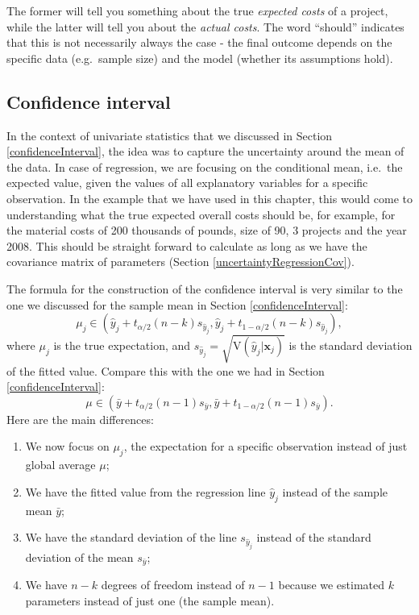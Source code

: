 \documentclass[
]{book}
\providecommand{\tightlist}{%
  \setlength{\itemsep}{0pt}\setlength{\parskip}{0pt}}
\theoremstyle{definition}
\theoremstyle{definition}
\theoremstyle{definition}
\theoremstyle{definition}
\theoremstyle{remark}
\begin{document}
The former will tell you something about the true \emph{expected costs} of a project, while the latter will tell you about the \emph{actual costs}. The word ``should'' indicates that this is not necessarily always the case - the final outcome depends on the specific data (e.g.~sample size) and the model (whether its assumptions hold).

\subsection{Confidence interval}\label{uncertaintyRegressionLineConfidence}

In the context of univariate statistics that we discussed in Section \ref{confidenceInterval}, the idea was to capture the uncertainty around the mean of the data. In case of regression, we are focusing on the conditional mean, i.e.~the expected value, given the values of all explanatory variables for a specific observation. In the example that we have used in this chapter, this would come to understanding what the true expected overall costs should be, for example, for the material costs of 200 thousands of pounds, size of 90, 3 projects and the year 2008. This should be straight forward to calculate as long as we have the covariance matrix of parameters (Section \ref{uncertaintyRegressionCov}).

The formula for the construction of the confidence interval is very similar to the one we discussed for the sample mean in Section \ref{confidenceInterval}:
\begin{equation}
\mu_j \in (\hat{y}_j + t_{\alpha/2}(n-k) s_{\hat{y}_j}, \hat{y}_j + t_{1-\alpha/2}(n-k) s_{\hat{y}_j}),
\label{eq:confidenceIntervalRegression}
\end{equation}
where \(\mu_j\) is the true expectation, and \(s_{\hat{y}_j}=\sqrt{\mathrm{V}(\hat{y}_j| \mathbf{x}_j)}\) is the standard deviation of the fitted value. Compare this with the one we had in Section \ref{confidenceInterval}:
\begin{equation*}
\mu \in (\bar{y} + t_{\alpha/2}(n-1) s_{\bar{y}}, \bar{y} + t_{1-\alpha/2}(n-1) s_{\bar{y}}).
\end{equation*}
Here are the main differences:

\begin{enumerate}
\def\labelenumi{\arabic{enumi}.}
\tightlist
\item
  We now focus on \(\mu_j\), the expectation for a specific observation instead of just global average \(\mu\);
\item
  We have the fitted value from the regression line \(\hat{y}_j\) instead of the sample mean \(\bar{y}\);
\item
  We have the standard deviation of the line \(s_{\hat{y}_j}\) instead of the standard deviation of the mean \(s_{\bar{y}}\);
\item
  We have \(n-k\) degrees of freedom instead of \(n-1\) because we estimated \(k\) parameters instead of just one (the sample mean).
\end{enumerate}
\end{document}
